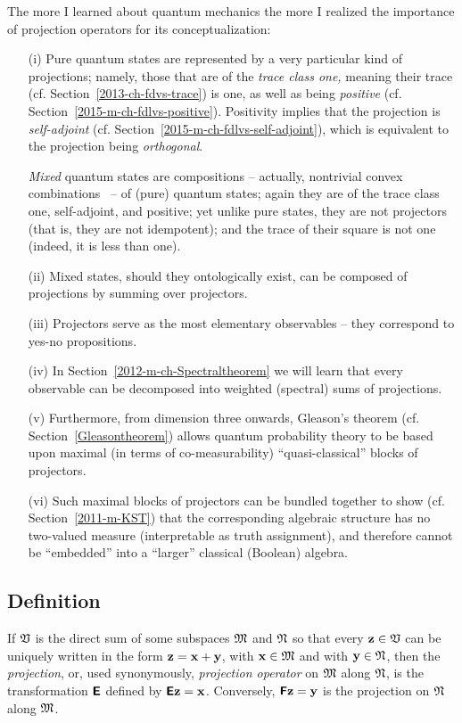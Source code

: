 The more I learned about quantum mechanics the more
I realized the importance of projection operators for its conceptualization:\cite[0mm]{v-neumann-49,birkhoff-36}
\begin{itemize}
\item[(i)]
Pure quantum states
are represented by a very particular kind of projections;
namely, those that are of the {\em trace class one,} meaning their trace (cf. Section~\ref{2013-ch-fdvs-trace}) is one,
as well as being {\em positive}
(cf. Section~\ref{2015-m-ch-fdlvs-positive}).
Positivity implies
that the projection is {\em self-adjoint} (cf. Section~\ref{2015-m-ch-fdlvs-self-adjoint}),
which is equivalent to the projection being {\em orthogonal}.

{\em Mixed} quantum states
are compositions -- actually, nontrivial convex combinations~ -- of (pure) quantum states; again they are of the trace class one, self-adjoint, and positive;
yet unlike pure states, they are not projectors (that is, they are not idempotent);
and the trace of their square is not one (indeed, it is less than one).
\item[(ii)]
Mixed states, should they ontologically exist, can be composed of projections by summing over projectors.
\item[(iii)]
Projectors serve as the most elementary observables -- they correspond to yes-no propositions.
\item[(iv)]
In Section~\ref{2012-m-ch-Spectraltheorem} we will learn
that every observable can be decomposed into weighted (spectral) sums of projections.
\item[(v)]
Furthermore, from dimension three onwards, Gleason's theorem (cf. Section~\ref{Gleasontheorem}) allows
quantum probability theory to be based upon maximal (in terms of co-measurability) ``quasi-classical''
blocks of projectors.
\item[(vi)]
Such maximal blocks of projectors can be bundled together to show (cf. Section~\ref{2011-m-KST})
that the corresponding algebraic
structure has no two-valued measure (interpretable as truth assignment), and
therefore cannot be ``embedded'' into a ``larger'' classical (Boolean) algebra.
\end{itemize}



\subsection{Definition}
If ${\frak V}$ is the direct sum of some subspaces
${\frak M}$
and
${\frak N}$
so that every ${\bf z} \in {\frak V}$ can be uniquely written in the form
$
{\bf z}
=
{\bf x}
+
{\bf y}
$, with
${\bf x} \in {\frak M}$
and with
${\bf y} \in {\frak N}$,
then
the {\em projection}, or, used synonymously,
{\em projection operator}
on ${\frak M}$
along ${\frak N}$, is the transformation $\textsf{\textbf{E}}$
defined by $\textsf{\textbf{E}}{\bf z}={\bf x}$.
Conversely,
 $\textsf{\textbf{F}}{\bf z}={\bf y}$  is the projection
on ${\frak N}$
along ${\frak M}$.

